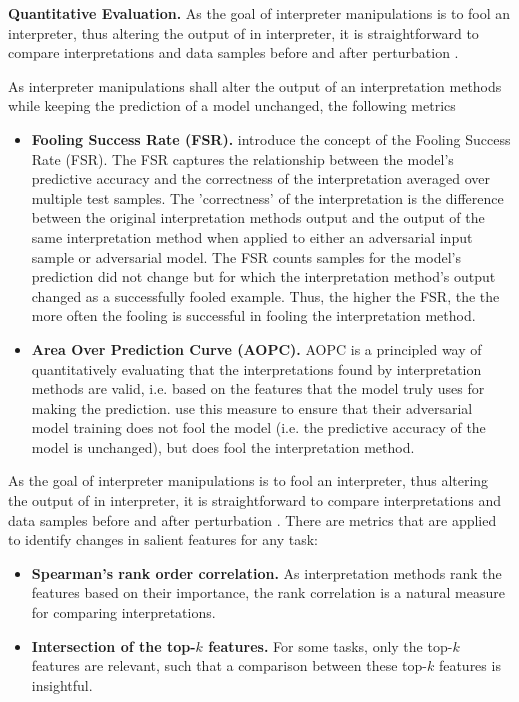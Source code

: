 \documentclass[sigconf]{acmart}
\newcommand{\mypar}[1]{\vspace{0.2cm}\noindent\textbf{#1}}
\begin{document}
\mypar{Quantitative Evaluation.} 
As the goal of interpreter manipulations is to fool an interpreter, thus altering the output of in interpreter, it is straightforward to compare interpretations and data samples before and after perturbation \cite{ghorbani2019interpretation}.

As interpreter manipulations shall alter the output of an interpretation methods while keeping the prediction of a model unchanged, the following metrics 

\begin{itemize}
    \item \textbf{Fooling Success Rate (FSR).} \cite{fooling_nn_interpreters} introduce the concept of the Fooling Success Rate (FSR). The FSR captures the relationship between the model's predictive accuracy and the correctness of the interpretation averaged over multiple test samples. The 'correctness' of the interpretation is the difference between the original interpretation methods output and the output of the same interpretation method when applied to either an adversarial input sample or adversarial model. 
    The FSR counts samples for the model's prediction did not change but for which the interpretation method's output changed as a successfully fooled example. Thus, the higher the FSR, the the more often the fooling is successful in fooling the interpretation method. 
    \item \textbf{Area Over Prediction Curve (AOPC). } AOPC \cite{samek2016evaluating} is a principled way of quantitatively evaluating that the interpretations found by interpretation methods are valid, i.e. based on the features that the model truly uses for making the prediction. \cite{fooling_nn_interpreters} use this measure to ensure that their adversarial model training does not fool the model (i.e. the predictive accuracy of the model is unchanged), but does fool the interpretation method.
\end{itemize}

As the goal of interpreter manipulations is to fool an interpreter, thus altering the output of in interpreter, it is straightforward to compare interpretations and data samples before and after perturbation \cite{ghorbani2019interpretation}.
There are metrics that are applied to identify changes in salient features for any task:
\begin{itemize}
    \item \textbf{Spearman's rank order correlation.} As interpretation methods rank the features based on their importance, the rank correlation \cite{spearman1961proof} is a natural measure for comparing interpretations. 
    \item \textbf{Intersection of the top-$k$ features.} For some tasks, only the top-$k$ features are relevant, such that a comparison between these top-$k$ features is insightful. 
\end{itemize}
\end{document}
